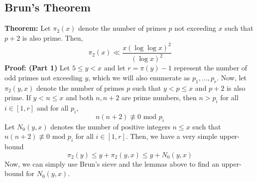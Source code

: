 \documentclass[8pt]{extarticle}
\begin{document}
\subsection{Brun's Theorem}
\begin{boxedsection}
    \textbf{Theorem:} Let $\pi_2(x)$ denote the number of primes $p$ not exceeding $x$ such that $p+2$ is also prime. Then,
    $$
    \pi_2(x) \ll \frac{x (\log \log x)^2}{(\log x)^2}
    $$
    \textbf{Proof: (Part 1)} Let $5 \leq y < x$ and let $r = \pi(y) - 1$ represent the number of odd primes not exceeding $y$, which we will also enumerate as $p_1, \dots, p_r$. Now, let $\pi_2(y,x)$ denote the 
    number of primes $p$ such that $y < p \leq x$ and $p+2$ is also prime. If $y < n \leq x$ and both $n, n+2$ are prime numbers, then $n > p_i$ for all $i \in [1,r]$ and for all $p_i$,
    $$
    n(n+2) \nequiv 0 \text{ mod } p_i
    $$
    Let $N_0(y,x)$ denotes the number of positive integers $n \leq x$ such that $n(n+2) \nequiv 0 \text{ mod } p_i$ for all $i \in [1,r]$. Then, we have a very simple upper-bound
    $$
    \pi_2(y) \leq y + \pi_2(y,x) \leq y + N_0(y,x)
    $$
    Now, we can simply use Brun's sieve and the lemmas above to find an upper-bound for $N_0(y,x)$.
\end{boxedsection}
\end{document}

